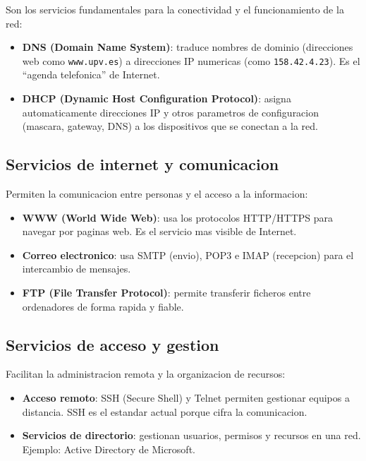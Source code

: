 Son los servicios fundamentales para la conectividad y el funcionamiento de la
red:

\begin{itemize}
    \item \textbf{DNS (Domain Name System)}: traduce nombres de dominio
    (direcciones web como \texttt{www.upv.es}) a direcciones IP numericas
    (como \texttt{158.42.4.23}). Es el ``agenda telefonica'' de Internet.
    \item \textbf{DHCP (Dynamic Host Configuration Protocol)}: asigna
    automaticamente direcciones IP y otros parametros de configuracion (mascara,
    gateway, DNS) a los dispositivos que se conectan a la red.
\end{itemize}

\subsection{Servicios de internet y comunicacion}

Permiten la comunicacion entre personas y el acceso a la informacion:

\begin{itemize}
    \item \textbf{WWW (World Wide Web)}: usa los protocolos HTTP/HTTPS para
    navegar por paginas web. Es el servicio mas visible de Internet.
    \item \textbf{Correo electronico}: usa SMTP (envio), POP3 e IMAP (recepcion)
    para el intercambio de mensajes.
    \item \textbf{FTP (File Transfer Protocol)}: permite transferir ficheros entre
    ordenadores de forma rapida y fiable.
\end{itemize}

\subsection{Servicios de acceso y gestion}

Facilitan la administracion remota y la organizacion de recursos:

\begin{itemize}
    \item \textbf{Acceso remoto}: SSH (Secure Shell) y Telnet permiten gestionar
    equipos a distancia. SSH es el estandar actual porque cifra la comunicacion.
    \item \textbf{Servicios de directorio}: gestionan usuarios, permisos y recursos
    en una red. Ejemplo: Active Directory de Microsoft.
\end{itemize}

